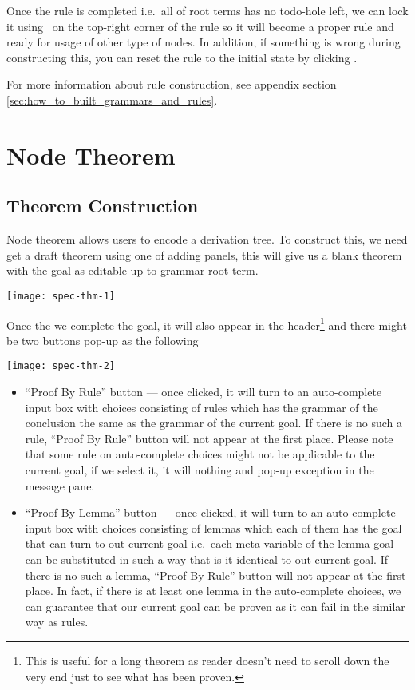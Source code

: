 \documentclass[master.tex]{subfiles}
\begin{document}
Once the rule is completed i.e.\ all of root terms has no todo-hole left, we can
lock it using \lockButton\ on the top-right corner of the rule so it will
become a proper rule and ready for usage of other type of nodes. In addition,
if something is wrong during constructing this, you can reset the rule to the
initial state by clicking \resetButton.

For more information about rule construction, see appendix section
\ref{sec:how_to_built_grammars_and_rules}.

\section{Node Theorem}
\label{spec:node_theorem}

\subsection{Theorem Construction}

Node theorem allows users to encode a derivation tree. To construct this, we
need get a draft theorem using one of adding panels, this will give us a blank
theorem with the goal as editable-up-to-grammar root-term.

\begin{center}
\texttt{[image: spec-thm-1]}
\end{center}

Once the we complete the goal, it will also appear in the header\footnote{This
  is useful for a long theorem as reader doesn't need to scroll down the very
  end just to see what has been proven.} and there might be two buttons pop-up
as the following

\begin{center}
\texttt{[image: spec-thm-2]}
\end{center}

\begin{itemize}
\item ``Proof By Rule'' button --- once clicked, it will turn to an
  auto-complete input box with choices consisting of rules which has the grammar
  of the conclusion the same as the grammar of the current goal. If there is no
  such a rule, ``Proof By Rule'' button will not appear at the first place.
  Please note that some rule on auto-complete choices might not be applicable to
  the current goal, if we select it, it will nothing and pop-up exception in the
  message pane.
\item ``Proof By Lemma'' button --- once clicked, it will turn to an
  auto-complete input box with choices consisting of lemmas which each of them
  has the goal that can turn to out current goal i.e.\ each meta variable of the
  lemma goal can be substituted in such a way that is it identical to out
  current goal. If there is no such a lemma, ``Proof By Rule'' button will not
  appear at the first place. In fact, if there is at least one lemma in the
  auto-complete choices, we can guarantee that our current goal can be proven as
  it can fail in the similar way as rules.
\end{itemize}
\end{document}
